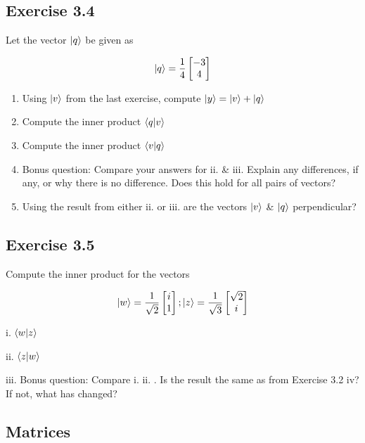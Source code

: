 \documentclass{book}
\begin{document}
\hline

\subsection{Exercise 3.4}

Let the vector $\ket{q}$ be given as 

$$ \ket{q} = \frac{1}{4} \begin{bmatrix} -3 \\ 4 \end{bmatrix} $$

\begin{enumerate}[i]
    \item Using $\ket{v}$ from the last exercise, compute  $\ket{y} = \ket{v} + \ket{q} $
    \item Compute the inner product $ \braket{q | v} $
    \item Compute the inner product $ \braket{v | q} $ 
    \item Bonus question: Compare your answers for ii. \& iii. Explain any differences, if any, or why there is no difference. Does this hold for all pairs of vectors?
    \item Using the result from either ii. or iii. are the vectors $\ket{v}$ \& $\ket{q}$ perpendicular?
    
\end{enumerate}


\subsection{Exercise 3.5}

Compute the inner product for the vectors 

$$ \ket{w} = \frac{1}{\sqrt{2}} \begin{bmatrix} i \\ 1 \end{bmatrix} ; \ket{z} = \frac{1}{\sqrt{3}} \begin{bmatrix} \sqrt{2} \\ i \end{bmatrix}$$

i. $\braket{w|z}$

ii. $\braket{z|w}$

iii. Bonus question: Compare i. ii. . Is the result the same as from Exercise 3.2 iv? 
If not, what has changed?

\hline

\subsection{ Matrices}
\end{document}
